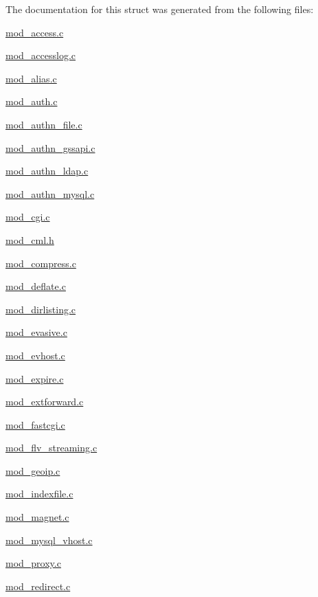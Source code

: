 The documentation for this struct was generated from the following files\-:\begin{DoxyCompactItemize}
\item 
\hyperlink{mod__access_8c}{mod\-\_\-access.\-c}\item 
\hyperlink{mod__accesslog_8c}{mod\-\_\-accesslog.\-c}\item 
\hyperlink{mod__alias_8c}{mod\-\_\-alias.\-c}\item 
\hyperlink{mod__auth_8c}{mod\-\_\-auth.\-c}\item 
\hyperlink{mod__authn__file_8c}{mod\-\_\-authn\-\_\-file.\-c}\item 
\hyperlink{mod__authn__gssapi_8c}{mod\-\_\-authn\-\_\-gssapi.\-c}\item 
\hyperlink{mod__authn__ldap_8c}{mod\-\_\-authn\-\_\-ldap.\-c}\item 
\hyperlink{mod__authn__mysql_8c}{mod\-\_\-authn\-\_\-mysql.\-c}\item 
\hyperlink{mod__cgi_8c}{mod\-\_\-cgi.\-c}\item 
\hyperlink{mod__cml_8h}{mod\-\_\-cml.\-h}\item 
\hyperlink{mod__compress_8c}{mod\-\_\-compress.\-c}\item 
\hyperlink{mod__deflate_8c}{mod\-\_\-deflate.\-c}\item 
\hyperlink{mod__dirlisting_8c}{mod\-\_\-dirlisting.\-c}\item 
\hyperlink{mod__evasive_8c}{mod\-\_\-evasive.\-c}\item 
\hyperlink{mod__evhost_8c}{mod\-\_\-evhost.\-c}\item 
\hyperlink{mod__expire_8c}{mod\-\_\-expire.\-c}\item 
\hyperlink{mod__extforward_8c}{mod\-\_\-extforward.\-c}\item 
\hyperlink{mod__fastcgi_8c}{mod\-\_\-fastcgi.\-c}\item 
\hyperlink{mod__flv__streaming_8c}{mod\-\_\-flv\-\_\-streaming.\-c}\item 
\hyperlink{mod__geoip_8c}{mod\-\_\-geoip.\-c}\item 
\hyperlink{mod__indexfile_8c}{mod\-\_\-indexfile.\-c}\item 
\hyperlink{mod__magnet_8c}{mod\-\_\-magnet.\-c}\item 
\hyperlink{mod__mysql__vhost_8c}{mod\-\_\-mysql\-\_\-vhost.\-c}\item 
\hyperlink{mod__proxy_8c}{mod\-\_\-proxy.\-c}\item 
\hyperlink{mod__redirect_8c}{mod\-\_\-redirect.\-c}\item 

\end{DoxyCompactItemize}
